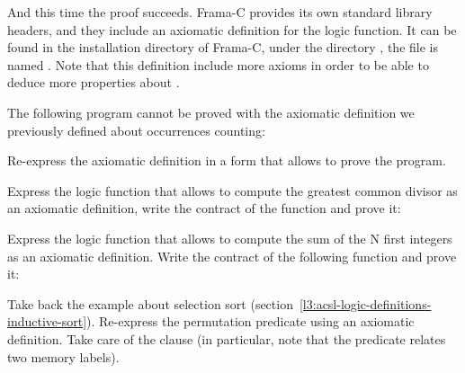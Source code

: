 



And this time the proof succeeds. Frama-C provides its own standard
library headers, and they include an
axiomatic definition for the  logic function. It can
be found in the installation directory of Frama-C, under the directory
, the file is named .
Note that this definition include more axioms in order to be able to
deduce more properties about .







The following program cannot be proved with the axiomatic definition we
previously defined about occurrences counting:




Re-express the axiomatic definition in a form that allows to prove the
program.




Express the logic function that allows to compute the greatest common divisor as
an axiomatic definition, write the contract of the  function and
prove it:






Express the logic function that allows to compute the sum of the N first
integers as an axiomatic definition. Write the contract of the following
 function and prove it:






Take back the example about selection sort
(section~\ref{l3:acsl-logic-definitions-inductive-sort}). Re-express the
permutation predicate using an axiomatic definition. Take care of the
 clause (in particular, note that the predicate relates
two memory labels).


